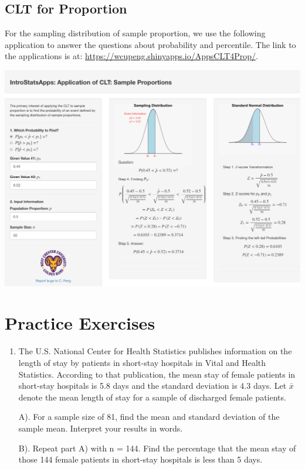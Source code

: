 \documentclass[
]{book}
\begin{document}
\hypertarget{clt-for-proportion}{%
\subsection{CLT for Proportion}\label{clt-for-proportion}}

For the sampling distribution of sample proportion, we use the following application to answer the questions about probability and percentile. The link to the applications is at: \url{https://wcupeng.shinyapps.io/AppsCLT4Prop/}.

\begin{center}\includegraphics[width=1\linewidth]{week05/cltProp} \end{center}

\hfill\break

\hypertarget{practice-exercises}{%
\section{Practice Exercises}\label{practice-exercises}}

\begin{enumerate}
\def\labelenumi{\arabic{enumi}.}
\item
  The U.S. National Center for Health Statistics publishes information on the length of stay by patients in short-stay hospitals in Vital and Health Statistics. According to that publication, the mean stay of female patients in short-stay hospitals is 5.8 days and the standard deviation is 4.3 days. Let \(\bar{x}\) denote the mean length of stay for a sample of discharged female patients.

  A). For a sample size of 81, find the mean and standard deviation of the sample mean. Interpret your results in words.

  B). Repeat part A) with n = 144. Find the percentage that the mean stay of those 144 female patients in short-stay hospitals is less than 5 days.
\end{enumerate}
\end{document}
